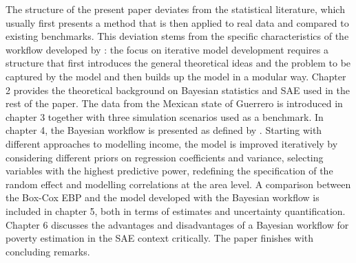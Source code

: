 The structure of the present paper deviates from the statistical literature, which usually first presents a method that is then applied to real data and compared to existing benchmarks.
This deviation stems from the specific characteristics of the workflow developed by \cite{gelman_bayesian_2020}:
the focus on iterative model development requires a structure that first introduces the general theoretical ideas and the problem to be captured by the model and then builds up the model in a modular way.
Chapter 2 provides the theoretical background on Bayesian statistics and SAE used in the rest of the paper.
The data from the Mexican state of Guerrero is introduced in chapter 3 together with three simulation scenarios used as a benchmark.
In chapter 4, the Bayesian workflow is presented as defined by \cite{gelman_bayesian_2020}.
Starting with different approaches to modelling income, the model is improved iteratively by considering different priors on regression coefficients and variance, selecting variables with the highest predictive power, redefining the specification of the random effect and modelling correlations at the area level.
A comparison between the Box-Cox EBP \citep{rojas_perilla_data_2020} and the model developed with the Bayesian workflow is included in chapter 5, both in terms of estimates and uncertainty quantification.
Chapter 6 discusses the advantages and disadvantages of a Bayesian workflow for poverty estimation in the SAE context critically.
The paper finishes with concluding remarks.


